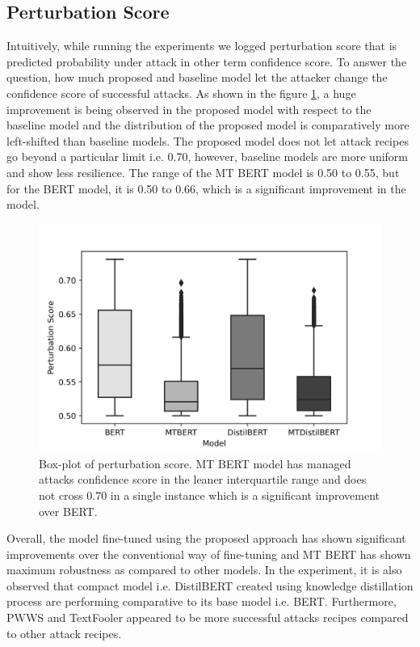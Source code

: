 \documentclass[%
	BCOR=8mm, %
	DIV=12,
	toc=bibliography, %
	toc=listof, %
	oneside, %
	egregdoesnotlikesansseriftitles, %
	]{scrbook}
\begin{document}
\subsection{Perturbation Score}
Intuitively, while running the experiments we logged perturbation score that is predicted probability under attack in other term confidence score. To answer the question, how much proposed and baseline model let the attacker change the confidence score of successful attacks. As shown in the figure \ref{fig:pertscoredist}, a huge improvement is being observed in the proposed model  with respect to the baseline model and the distribution of the proposed model is comparatively more left-shifted than baseline models. The proposed model does not let attack recipes go beyond a particular limit i.e. 0.70, however, baseline models are more uniform and show less resilience.  The range of the MT BERT model is 0.50 to 0.55, but for the BERT model, it is 0.50 to 0.66, which is a significant improvement in the model.
\begin{figure}[H]
    \centering
    \includegraphics[width=.75\linewidth]{img/PertScoreDist}
    \caption[Box-plot of perturbation score]{\small Box-plot of perturbation score. MT BERT model has managed attacks confidence score in the leaner interquartile range and does not cross 0.70 in a single instance which is a significant improvement over BERT.}
    \label{fig:pertscoredist}
\end{figure}
 Overall, the model fine-tuned using the proposed approach has shown significant improvements over the conventional way of fine-tuning and MT BERT has shown maximum robustness as compared to other models. In the experiment, it is also observed that compact model i.e. DistilBERT created using knowledge distillation process are performing comparative to its base model i.e. BERT. Furthermore, PWWS and TextFooler appeared to be more successful attacks recipes compared to other attack recipes. 
\end{document}
